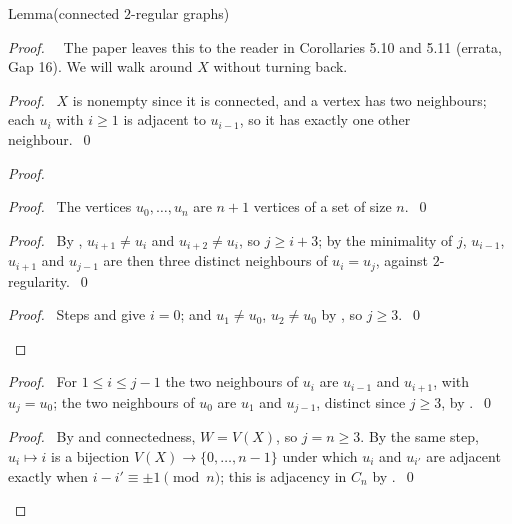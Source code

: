\begin{namedresult}{Lemma}{(connected $2$-regular graphs)}\label{lem:cycle}
\end{namedresult}
\begin{proof}
 \pfsketch\ \repair\ The paper leaves this to the reader in Corollaries 5.10 and 5.11 (errata,
 Gap 16). We will walk around $X$ without turning back.
 \begin{proof}\pf\ $X$ is nonempty since it is connected, and a vertex has two neighbours; each
  $u_i$ with $i\ge1$ is adjacent to $u_{i-1}$, so it has exactly one other
  neighbour.~\qed\end{proof}
 \begin{proof}
  \begin{proof}\pf\ The vertices $u_0,\dots,u_n$ are $n+1$ vertices of a set of size $n$.~\qed\end{proof}
  \begin{proof}\pf\ By , $u_{i+1}\ne u_i$ and $u_{i+2}\ne u_i$, so $j\ge i+3$;
   by the minimality of $j$, $u_{i-1}$, $u_{i+1}$ and $u_{j-1}$ are then three distinct
   neighbours of $u_i=u_j$, against $2$-regularity.~\qed\end{proof}
  \qedstep
  \begin{proof}\pf\ Steps  and  give $i=0$; and
   $u_1\ne u_0$, $u_2\ne u_0$ by , so $j\ge3$.~\qed\end{proof}
 \end{proof}
 \begin{proof}\pf\ For $1\le i\le j-1$ the two neighbours of $u_i$ are $u_{i-1}$ and $u_{i+1}$,
  with $u_j=u_0$; the two neighbours of $u_0$ are $u_1$ and $u_{j-1}$, distinct since $j\ge3$,
  by .~\qed\end{proof}
 \qedstep
 \begin{proof}\pf\ By  and connectedness, $W=V(X)$, so $j=n\ge3$. By the
  same step, $u_i\mapsto i$ is a bijection $V(X)\to\{0,\dots,n-1\}$ under which $u_i$ and $u_{i'}$
  are adjacent exactly when $i-i'\equiv\pm1\pmod n$; this is adjacency in
  $C_n$ by .~\qed\end{proof}
\end{proof}

